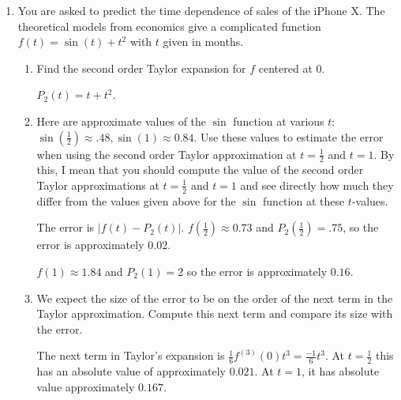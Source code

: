 \documentclass[main]{subfiles}
\begin{document}
\begin{enumerate}
   
 \item \label{motivate-taylor}
    You are asked to predict the time dependence of sales of the iPhone X. The theoretical models from
economics give a complicated function $f(t)=\sin(t)+t^2$ with $t$ given in months.
\begin{enumerate}
    \item \begin{problem}[\vfill]
        Find the second order Taylor expansion for $f$ centered at 0.
    \end{problem}
    
    \begin{solution}
        $P_2(t)=t+t^2$.
    \end{solution}
    \item \begin{problem}[\vfill]
        Here are approximate values of the $\sin$ function at various $t$: $\sin(\frac{1}{2})\approx .48,\sin(1) \approx 0.84$.
Use these values to estimate the error when using the second order Taylor approximation at $t=\frac{1}{2}$ and $t=1$. By this, I mean that you should compute the value of the second order Taylor
approximations at $t =\frac{1}{2}$
and $t = 1$ and see directly how much they differ from the values given above for the $\sin$ function at these $t$-values.

    \end{problem}
    
    \begin{solution}
        The error is $|f(t)-P_2(t)|$.
        $f(\frac{1}{2})\approx 0.73$ and $P_2(\frac{1}{2})=.75$, so the error is approximately $0.02$.

        $f(1)\approx 1.84$ and $P_2(1)=2$ so the error is approximately $0.16$.
    \end{solution}
    \item \begin{problem}[\vfill]
        We expect the size of the error to be on the order of the next term in the Taylor approximation. Compute this next term and compare its size with the error.
    \end{problem}

    \begin{solution}
        The next term in Taylor's expansion is $\frac{1}{6}f^{(3)}(0)t^3=\frac{-1}{6}t^3$. At $t=\frac{1}{2}$ this has an absolute value of approximately $0.021$. At $t=1$, it has absolute value approximately $0.167$.
    \end{solution}


\end{enumerate}
\end{enumerate}
\end{document}
